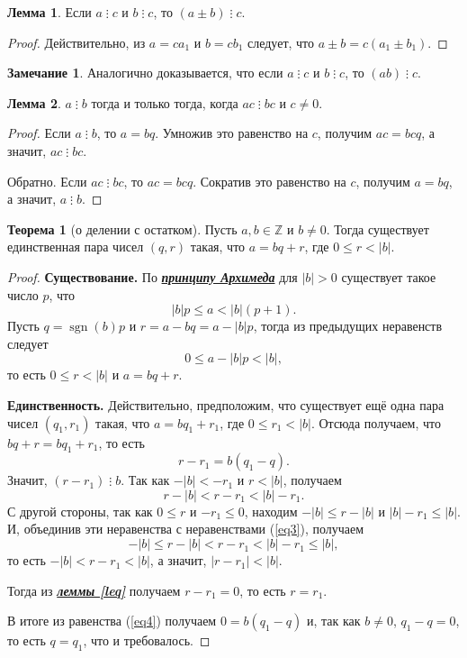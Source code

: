 \documentclass[14pt, a4paper]{extarticle}
\theoremstyle{definition}
\newtheorem{theorem}{Теорема}
\newtheorem{lemma}{Лемма}
\newtheorem*{remark}{Замечание}
\newcommand{\divisible}{\mathop{\vdots}}
\DeclareMathOperator{\sgn}{sgn}
\begin{document}
	\begin{lemma}
	\label{sum}
		Если $a\divisible c$ и $b\divisible c$, то $(a\pm b)\divisible c$.
	\end{lemma}
	\begin{proof}
		Действительно, из $a=ca_1$ и $b=cb_1$ следует, что $a\pm b=c(a_1\pm b_1)$.
	\end{proof}

	\begin{remark}
		Аналогично доказывается, что если $a\divisible c$ и $b\divisible c$, то $(ab)\divisible c$.
	\end{remark}

	\begin{lemma}
	\label{sokr}
		$a\divisible b$ тогда и только тогда, когда $ac\divisible bc$ и $c\neq0$.
	\end{lemma}
	\begin{proof}
		Если $a\divisible b$, то $a=bq$. Умножив это равенство на $c$, получим $ac=bcq$, а значит, $ac\divisible bc$.
		
		Обратно. Если $ac\divisible bc$, то $ac=bcq$. Сократив это равенство на $c$, получим $a=bq$, а значит, $a\divisible b$.
	\end{proof}

	\begin{theorem}[о делении с остатком]
	\label{ost}
		Пусть $a,b\in\mathbb{Z}$ и $b\neq0$. Тогда существует единственная пара чисел $(q,r)$ такая, что $a=bq+r$, где $0\leqslant r<|b|$.
	\end{theorem}
	\begin{proof}
		\textbf{Существование.} По \href{https://ru.wikipedia.org/wiki/%D0%90%D0%BA%D1%81%D0%B8%D0%BE%D0%BC%D0%B0_%D0%90%D1%80%D1%85%D0%B8%D0%BC%D0%B5%D0%B4%D0%B0}{\textbf{\textit{принципу Архимеда}}} для $|b|>0$ существует такое число $p$, что $$|b|p\leqslant a<|b|(p+1).$$
		Пусть $q=\sgn(b)p$ и $r=a-bq=a-|b|p$, тогда из предыдущих неравенств следует $$0\leqslant a-|b|p<|b|,$$ то есть $0\leqslant r<|b|$ и $a=bq+r$.
		
		\textbf{Единственность.} Действительно, предположим, что существует ещё одна пара чисел $(q_1,r_1)$ такая, что $a=bq_1+r_1$, где $0\leqslant r_1<|b|$. Отсюда получаем, что $bq+r=bq_1+r_1$, то есть
		\begin{equation}
		\label{eq4}
			r-r_1=b(q_1-q).
		\end{equation}
		Значит, $(r-r_1)\divisible b$. Так как $-|b|<-r_1$ и $r<|b|$, получаем
		\begin{equation}
		\label{eq3}
			r-|b|<r-r_1<|b|-r_1.
		\end{equation}
		С другой стороны, так как $0\leqslant r$ и $-r_1\leqslant0$, находим $-|b|\leqslant r-|b|$ и $|b|-r_1\leqslant |b|$. И, объединив эти неравенства с неравенствами (\ref{eq3}), получаем $$-|b|\leqslant r-|b|<r-r_1<|b|-r_1\leqslant |b|,$$ то есть $-|b|<r-r_1<|b|$, а значит, $|r-r_1|<|b|$.

		Тогда из \hyperref[leq]{\textbf{\textit{леммы \ref*{leq}}}} получаем $r-r_1=0$, то есть $r=r_1$.
		
		В итоге из равенства (\ref{eq4}) получаем $0=b(q_1-q)$ и, так как $b\neq0$, $q_1-q=0$, то есть $q=q_1$, что и требовалось.
	\end{proof}
\end{document}
